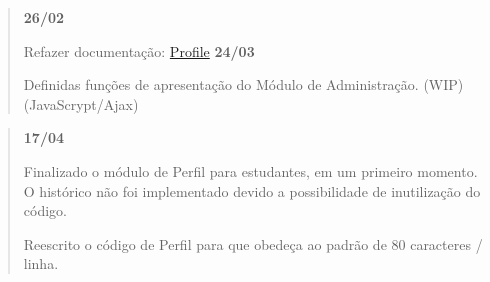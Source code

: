\begin{quotation}
{\bfseries 26/02}
\begin{DoxyItemize}
\item Refazer documentação\-: \hyperlink{namespaceProfile}{Profile} {\bfseries 24/03}
\item Definidas funções de apresentação do Módulo de Administração. (W\-I\-P) (Java\-Scrypt/\-Ajax)
\item 
\end{DoxyItemize}\end{quotation}


\begin{quotation}
{\bfseries 17/04}
\begin{DoxyItemize}
\item Finalizado o módulo de Perfil para estudantes, em um primeiro momento. O histórico não foi implementado devido a possibilidade de inutilização do código.
\item Reescrito o código de Perfil para que obedeça ao padrão de 80 caracteres / linha. 
\end{DoxyItemize}\end{quotation}
